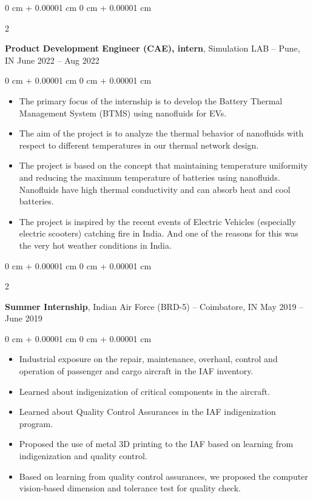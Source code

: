 \documentclass[10pt, letterpaper]{article}
\newenvironment{highlights}{
    \begin{itemize}[
        topsep=0.10 cm,
        parsep=0.10 cm,
        partopsep=0pt,
        itemsep=0pt,
        leftmargin=0 cm + 10pt
    ]
}{
    \end{itemize}
} %
\newenvironment{onecolentry}{
    \begin{adjustwidth}{
        0 cm + 0.00001 cm
    }{
        0 cm + 0.00001 cm
    }
}{
    \end{adjustwidth}
} %
\newenvironment{twocolentry}[2][]{
    \onecolentry
    \def\secondColumn{#2}
    \setcolumnwidth{\fill, 4.5 cm}
    \begin{paracol}{2}
}{
    \switchcolumn \raggedleft \secondColumn
    \end{paracol}
    \endonecolentry
} %
\begin{document}
        \vspace{0.2 cm}

        \begin{twocolentry}{
            June 2022 – Aug 2022
        }
            \textbf{Product Development Engineer (CAE), intern}, Simulation LAB -- Pune, IN\end{twocolentry}

        \vspace{0.10 cm}
        \begin{onecolentry}
            \begin{highlights}
               \item The primary focus of the internship is to develop the Battery Thermal Management System (BTMS) using nanofluids for EVs.
                \item The aim of the project is to analyze the thermal behavior of nanofluids with respect to different temperatures in our thermal network design.
                \item The project is based on the concept that maintaining temperature uniformity and reducing the maximum temperature of batteries using nanofluids. Nanofluids have high thermal conductivity and can absorb heat and cool batteries.
                \item The project is inspired by the recent events of Electric Vehicles (especially electric scooters) catching fire in India. And one of the reasons for this was the very hot weather conditions in India.
            \end{highlights}
        \end{onecolentry}

        \vspace{0.2 cm}

        \begin{twocolentry}{
            May 2019 – June 2019
        }
            \textbf{Summer Internship}, Indian Air Force (BRD-5) -- Coimbatore, IN\end{twocolentry}

        \vspace{0.10 cm}
        \begin{onecolentry}
            \begin{highlights}
                \item	Industrial exposure on the repair, maintenance, overhaul, control and operation of passenger and cargo aircraft in the IAF inventory. 
                \item	Learned about indigenization of critical components in the aircraft.
                \item	Learned about Quality Control Assurances in the IAF indigenization program.
                \item	Proposed the use of metal 3D printing to the IAF based on learning from indigenization and quality control.
                \item	Based on learning from quality control assurances, we proposed the computer vision-based dimension and tolerance test for quality check. 
                
            \end{highlights}
        \end{onecolentry}
\end{document}
